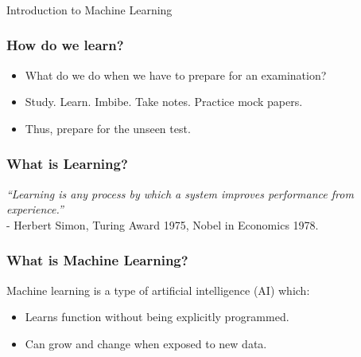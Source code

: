 \begin{frame}[fragile]\frametitle{}
\begin{center}
{\Large Introduction to Machine Learning}
\end{center}
\end{frame}

\begin{frame}[fragile]\frametitle{How do we learn?}
\begin{itemize}
	\item What do we do when we have to prepare for an examination? 
	\item Study. Learn. Imbibe. Take notes. Practice mock papers.
	\item  Thus,  prepare for the unseen test.
\end{itemize}
\end{frame}

\begin{frame}[fragile]\frametitle{What is Learning?}
\begin{center}
{\em ``Learning is any process by which a system improves performance from experience.'' \\}
- Herbert Simon, Turing Award 1975, Nobel in Economics 1978.
\end{center}

\end{frame}



\begin{frame}[fragile]\frametitle{What is Machine Learning?}
Machine learning is a type of artificial intelligence (AI) which:
\begin{itemize}
\item Learns function without being explicitly programmed. 
\item Can grow and change when exposed to new data. 
\end{itemize}
\end{frame}

